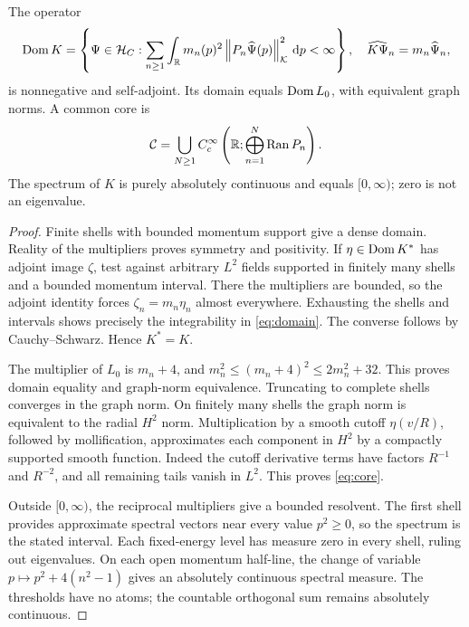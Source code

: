 \begin{theorem}\label{thm:operator}
The operator
\begin{equation}\label{eq:domain}
 \operatorname{Dom} K=\left\{\Psi\in\mathcal H_C:
 \sum_{n\geq1}\int_\mathbb R m_n(p)^2\left\lVert P_n\widehat\Psi(p)\right\rVert_\mathcal K^2\,\mathrm d p<\infty\right\},
 \quad \widehat{K\Psi}_n=m_n\widehat\Psi_n,
\end{equation}
is nonnegative and self-adjoint. Its domain equals \(\operatorname{Dom} L_0\), with
equivalent graph norms. A common core is
\begin{equation}\label{eq:core}
 \mathcal C=\bigcup_{N\geq1}C_c^\infty
 \left(\mathbb R;\bigoplus_{n=1}^N\operatorname{Ran} P_n\right).
\end{equation}
The spectrum of \(K\) is purely absolutely continuous and equals
\([0,\infty)\); zero is not an eigenvalue.
\end{theorem}
\begin{proof}
Finite shells with bounded momentum support give a dense domain.
Reality of the multipliers proves symmetry and positivity. If
\(\eta\in\operatorname{Dom} K^*\) has adjoint image \(\zeta\), test against arbitrary
\(L^2\) fields supported in finitely many shells and a bounded momentum
interval. There the multipliers are bounded, so the adjoint identity
forces \(\zeta_n=m_n\eta_n\) almost everywhere. Exhausting the shells
and intervals shows precisely the integrability in \eqref{eq:domain}.
The converse follows by Cauchy--Schwarz. Hence \(K^*=K\).

The multiplier of \(L_0\) is \(m_n+4\), and
\(m_n^2\leq(m_n+4)^2\leq2m_n^2+32\). This proves domain equality
and graph-norm equivalence. Truncating to complete shells converges in
the graph norm. On finitely many shells the graph norm is equivalent
to the radial \(H^2\) norm. Multiplication by a smooth cutoff
\(\eta(v/R)\), followed by mollification, approximates each component
in \(H^2\) by a compactly supported smooth function. Indeed the cutoff
derivative terms have factors \(R^{-1}\) and \(R^{-2}\), and all
remaining tails vanish in \(L^2\). This proves \eqref{eq:core}.

Outside \([0,\infty)\), the reciprocal multipliers give a bounded
resolvent. The first shell provides approximate spectral vectors near
every value \(p^2\geq0\), so the spectrum is the stated interval.
Each fixed-energy level has measure zero in every shell, ruling out
eigenvalues. On each open momentum half-line, the change of variable
\(p\mapsto p^2+4(n^2-1)\) gives an absolutely continuous spectral
measure. The thresholds have no atoms; the countable orthogonal sum
remains absolutely continuous.
\end{proof}

